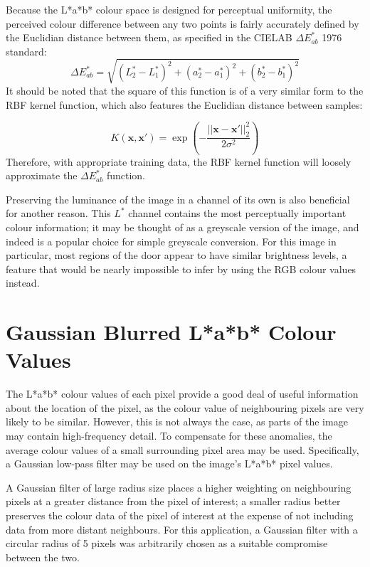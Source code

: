 Because the L*a*b* colour space is designed for perceptual uniformity, the perceived colour difference between any two points is fairly accurately defined by the Euclidian distance between them, as specified in the CIELAB $\Delta E_{ab}^*$ 1976 standard:
\begin{equation}
\Delta E_{ab}^* = \sqrt{ (L^*_2-L^*_1)^2+(a^*_2-a^*_1)^2 + (b^*_2-b^*_1)^2 }
\end{equation}
It should be noted that the square of this function is of a very similar form to the RBF kernel function, which also features the Euclidian distance between samples:

\begin{equation}
K(\mathbf{x}, \mathbf{x'}) = \exp\left(-\frac{||\mathbf{x} - \mathbf{x'}||_2^2}{2\sigma^2}\right)
\end{equation}
Therefore, with appropriate training data, the RBF kernel function will loosely approximate the $\Delta E_{ab}^*$ function.

  Preserving the luminance of the image in a channel of its own is also beneficial for another reason. This $L^*$ channel contains the most perceptually important colour information; it may be thought of as a greyscale version of the image, and indeed is a popular choice for simple greyscale conversion. For this image in particular, most regions of the door appear to have similar brightness levels, a feature that would be nearly impossible to infer by using the RGB colour values instead.

\section{Gaussian Blurred L*a*b* Colour Values}
The L*a*b* colour values of each pixel provide a good deal of useful information about the location of the pixel, as the colour value of neighbouring pixels are very likely to be similar.  However, this is not always the case, as parts of the image may contain high-frequency detail.  To compensate for these anomalies, the average colour values of a small surrounding pixel area may be used. Specifically, a Gaussian low-pass filter may be used on the image's L*a*b* pixel values.  

A Gaussian filter of large radius size places a higher weighting on neighbouring pixels at a greater distance from the pixel of interest; a smaller radius better preserves the colour data of the pixel of interest at the expense of not including data from more distant neighbours.  For this application, a Gaussian filter with a circular radius of 5 pixels was arbitrarily chosen as a suitable compromise between the two. 

